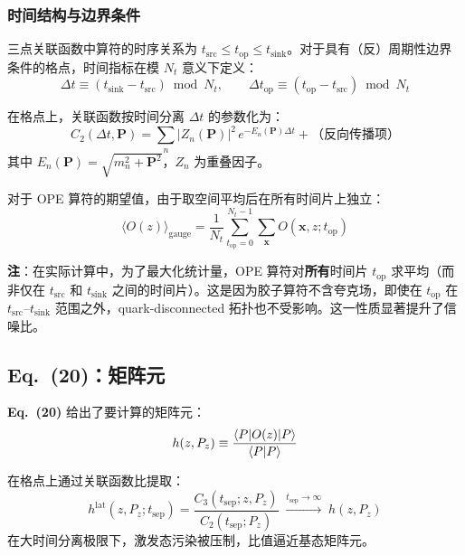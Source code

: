 \documentclass[11pt,a4paper]{ctexart}
\begin{document}
\subsubsection{时间结构与边界条件}

三点关联函数中算符的时序关系为 $t_{\text{src}} \le t_{\text{op}} \le t_{\text{sink}}$。对于具有（反）周期性边界条件的格点，时间指标在模 $N_t$ 意义下定义：
\begin{equation}
\Delta t \equiv (t_{\text{sink}} - t_{\text{src}}) \bmod N_t, \qquad
\Delta t_{\text{op}} \equiv (t_{\text{op}} - t_{\text{src}}) \bmod N_t
\end{equation}

在格点上，关联函数按时间分离 $\Delta t$ 的参数化为：
\begin{equation}\label{eq:C2_param}
C_2(\Delta t, \mathbf{P}) = \sum_n |Z_n(\mathbf{P})|^2 \,
e^{-E_n(\mathbf{P}) \Delta t} + \text{（反向传播项）}
\end{equation}
其中 $E_n(\mathbf{P}) = \sqrt{m_n^2 + \mathbf{P}^2}$，$Z_n$ 为重叠因子。

对于 OPE 算符的期望值，由于取空间平均后在所有时间片上独立：
\begin{equation}
\langle O(z) \rangle_{\text{gauge}} = \frac{1}{N_t}
\sum_{t_{\text{op}}=0}^{N_t-1} \sum_{\mathbf{x}} O(\mathbf{x}, z; t_{\text{op}})
\end{equation}

\textbf{注}：在实际计算中，为了最大化统计量，OPE 算符对\textbf{所有}时间片 $t_{\text{op}}$ 求平均（而非仅在 $t_{\text{src}}$ 和 $t_{\text{sink}}$ 之间的时间片）。这是因为胶子算符不含夸克场，即使在 $t_{\text{op}}$ 在 $t_{\text{src}} \text{--} t_{\text{sink}}$ 范围之外，quark-disconnected 拓扑也不受影响。这一性质显著提升了信噪比。

\subsection{Eq.~(20)：矩阵元}

\textbf{Eq.~(20)} 给出了要计算的矩阵元：
\begin{equation}
h(z, P_z) \equiv \frac{\braket{P | O(z) | P}}{\braket{P|P}}
\end{equation}

在格点上通过关联函数比提取：
\begin{equation}\label{eq:ratio}
h^{\text{lat}}(z, P_z; t_{\text{sep}}) =
\frac{C_3(t_{\text{sep}}; z, P_z)}{C_2(t_{\text{sep}}; P_z)}
\;\xrightarrow{t_{\text{sep}} \to \infty}\;
h(z, P_z)
\end{equation}
在大时间分离极限下，激发态污染被压制，比值逼近基态矩阵元。
\end{document}
